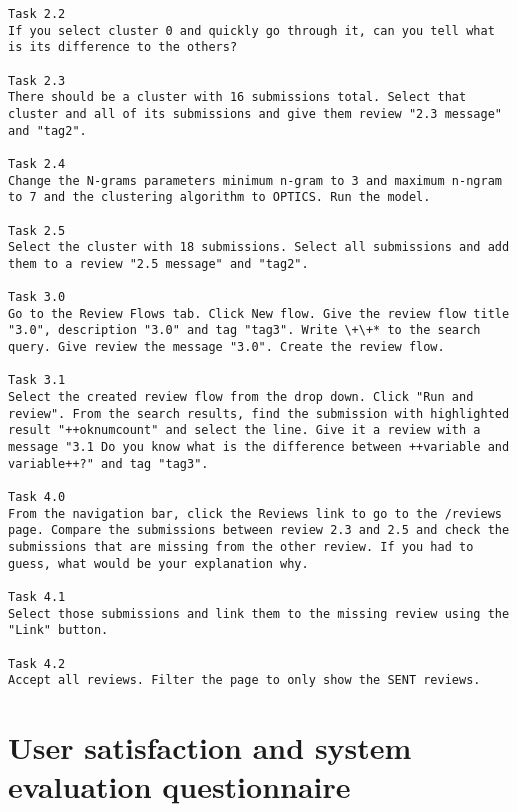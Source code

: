 \begin{lstlisting}
Task 2.2
If you select cluster 0 and quickly go through it, can you tell what is its difference to the others?

Task 2.3
There should be a cluster with 16 submissions total. Select that cluster and all of its submissions and give them review "2.3 message" and "tag2".

Task 2.4
Change the N-grams parameters minimum n-gram to 3 and maximum n-ngram to 7 and the clustering algorithm to OPTICS. Run the model.

Task 2.5
Select the cluster with 18 submissions. Select all submissions and add them to a review "2.5 message" and "tag2".

Task 3.0
Go to the Review Flows tab. Click New flow. Give the review flow title "3.0", description "3.0" and tag "tag3". Write \+\+* to the search query. Give review the message "3.0". Create the review flow.

Task 3.1
Select the created review flow from the drop down. Click "Run and review". From the search results, find the submission with highlighted result "++oknumcount" and select the line. Give it a review with a message "3.1 Do you know what is the difference between ++variable and variable++?" and tag "tag3".

Task 4.0
From the navigation bar, click the Reviews link to go to the /reviews page. Compare the submissions between review 2.3 and 2.5 and check the submissions that are missing from the other review. If you had to guess, what would be your explanation why.

Task 4.1
Select those submissions and link them to the missing review using the "Link" button. 

Task 4.2
Accept all reviews. Filter the page to only show the SENT reviews.

\end{lstlisting}

\chapter{User satisfaction and system evaluation questionnaire}
\label{appendix:questions-2}

